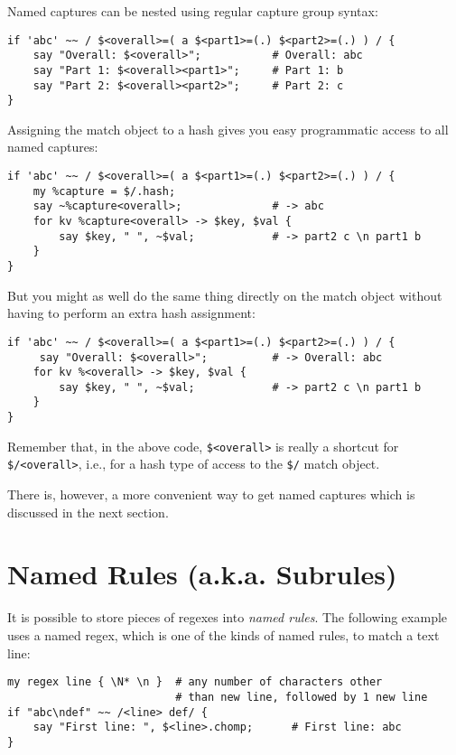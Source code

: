 Named captures can be nested using regular capture group syntax:

\begin{verbatim}
if 'abc' ~~ / $<overall>=( a $<part1>=(.) $<part2>=(.) ) / {
    say "Overall: $<overall>";           # Overall: abc
    say "Part 1: $<overall><part1>";     # Part 1: b
    say "Part 2: $<overall><part2>";     # Part 2: c
}
\end{verbatim} 

Assigning the match object to a hash gives you easy programmatic 
access to all named captures:

\begin{verbatim}
if 'abc' ~~ / $<overall>=( a $<part1>=(.) $<part2>=(.) ) / {
    my %capture = $/.hash;    
    say ~%capture<overall>;              # -> abc
    for kv %capture<overall> -> $key, $val {
        say $key, " ", ~$val;            # -> part2 c \n part1 b
    }
}
\end{verbatim} 

But you might as well do the same thing directly on the 
match object without having to perform an extra hash 
assignment:

\begin{verbatim}
if 'abc' ~~ / $<overall>=( a $<part1>=(.) $<part2>=(.) ) / {
     say "Overall: $<overall>";          # -> Overall: abc
    for kv %<overall> -> $key, $val {
        say $key, " ", ~$val;            # -> part2 c \n part1 b
    }
}
\end{verbatim}

Remember that, in the above code, \verb'$<overall>' is 
really a shortcut for  \verb'$/<overall>', i.e., for a 
hash type of access to the \verb'$/' match object.

There is, however, a more convenient way to get named 
captures which is discussed in the next section.

\section{Named Rules (a.k.a. Subrules)}
\label{subrules}

It is possible to store pieces of regexes into \emph{named rules}. The following example uses a named regex, which 
is one of the kinds of named rules, to match a text line:

\begin{verbatim}
my regex line { \N* \n }  # any number of characters other 
                          # than new line, followed by 1 new line
if "abc\ndef" ~~ /<line> def/ {
    say "First line: ", $<line>.chomp;      # First line: abc
}
\end{verbatim} 

